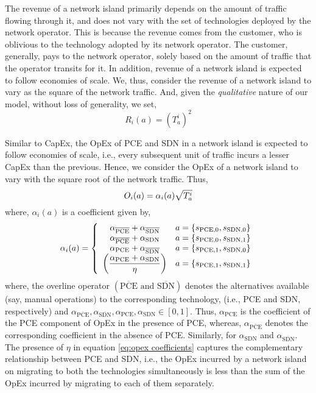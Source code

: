 \documentclass[smallextended]{svjour3}
\begin{document}
\par The revenue of a network island primarily depends on the amount of traffic
flowing through it, and does not vary with the set of technologies deployed by
the network operator. This is because the revenue comes from the customer, who
is oblivious to the technology adopted by its network operator. The customer,
generally, pays to the network operator, solely based on the amount of traffic
that the operator transits for it. In addition, revenue of a network island is
expected to follow economies of scale.
We, thus, consider the revenue of a network island to vary as the square of the
network traffic.
And, given the \emph{qualitative} nature of our model, without loss of
generality, we set,
\begin{equation} \label{eq:revenue definition}
R_i(a)=(T_{a}^i)^2
\end{equation}

Similar to CapEx, the OpEx of PCE and SDN in a network island is expected to
follow economies of scale, i.e.,  every subsequent unit of traffic incurs a lesser
CapEx than the previous. Hence, we consider the OpEx of a network island to vary
with the square root of the network traffic. Thus,
\begin{equation} \label{eq:opex definition}
O_i(a) = \alpha_i(a)\sqrt{T_a^i}\\
\end{equation}
where, $\alpha_i(a)$ is a coefficient given by,
\begin{equation} \label{eq:opex coefficients}
\alpha_i(a)=
\left\{\begin{array}{c l}
\alpha_{\overline{\textrm{PCE}}}+\alpha_{\overline{\textrm{SDN}}} & a = \{s_\textrm{PCE,0},s_\textrm{SDN,0}\} \\
\alpha_{\overline{\textrm{PCE}}}+\alpha_\textrm{SDN} & a = \{s_\textrm{PCE,0},s_\textrm{SDN,1}\} \\
\alpha_\textrm{PCE}+\alpha_{\overline{\textrm{SDN}}} & a = \{s_\textrm{PCE,1},s_\textrm{SDN,0}\} \\
\left(\dfrac{\alpha_\textrm{PCE}+\alpha_\textrm{SDN}}{\eta}\right) & a = \{s_\textrm{PCE,1},s_\textrm{SDN,1}\} \\
\end{array} \right.
\end{equation}
where, the overline operator $(\overline{\textrm{PCE}} \textrm{ and }
\overline{\textrm{SDN}})$ denotes the alternatives available (say, manual
operations) to the corresponding
technology, (i.e.,  PCE and SDN, respectively) and $\alpha_{\overline{\textrm{PCE}}}, \alpha_{\overline{\textrm{SDN}}}, \alpha_\textrm{PCE}, \alpha_\textrm{SDN} \in [0,1]$. Thus, $\alpha_\textrm{PCE}$ is the coefficient of
the PCE component of OpEx in the presence of PCE, whereas,
$\alpha_{\overline{\textrm{PCE}}}$ denotes the corresponding coefficient in the
absence of PCE. Similarly, for $\alpha_{\textrm{SDN}}$ and
$\alpha_{\overline{\textrm{SDN}}}$. The presence of $\eta$ in equation
\eqref{eq:opex coefficients} captures the complementary relationship between
PCE and SDN, i.e.,  the OpEx incurred by a network
island on migrating to both the technologies simultaneously is
less than the sum of the OpEx incurred by migrating to each
of them separately.
\end{document}
